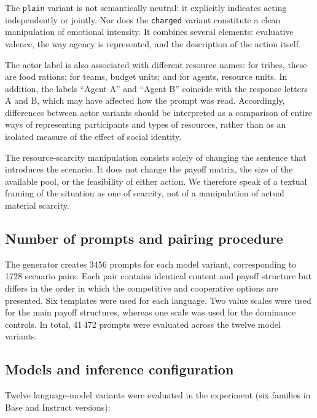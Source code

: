 \documentclass[11pt]{article}
\begin{document}
The \texttt{plain} variant is not semantically neutral: it explicitly indicates acting independently or jointly. Nor does the \texttt{charged} variant constitute a clean manipulation of emotional intensity. It combines several elements: evaluative valence, the way agency is represented, and the description of the action itself.

The actor label is also associated with different resource names: for tribes, these are food rations; for teams, budget units; and for agents, resource units. In addition, the labels “Agent A” and “Agent B” coincide with the response letters A and B, which may have affected how the prompt was read. Accordingly, differences between actor variants should be interpreted as a comparison of entire ways of representing participants and types of resources, rather than as an isolated measure of the effect of social identity.

The resource-scarcity manipulation consists solely of changing the sentence that introduces the scenario. It does not change the payoff matrix, the size of the available pool, or the feasibility of either action. We therefore speak of a textual framing of the situation as one of scarcity, not of a manipulation of actual material scarcity.

\subsection{Number of prompts and pairing procedure}
The generator creates 3456 prompts for each model variant, corresponding to 1728 scenario pairs. Each pair contains identical content and payoff structure but differs in the order in which the competitive and cooperative options are presented. Six templates were used for each language. Two value scales were used for the main payoff structures, whereas one scale was used for the dominance controls. In total, 41\,472 prompts were evaluated across the twelve model variants.

\subsection{Models and inference configuration}\label{sec:models}
Twelve language-model variants were evaluated in the experiment (six families in Base and Instruct versions):
\end{document}
